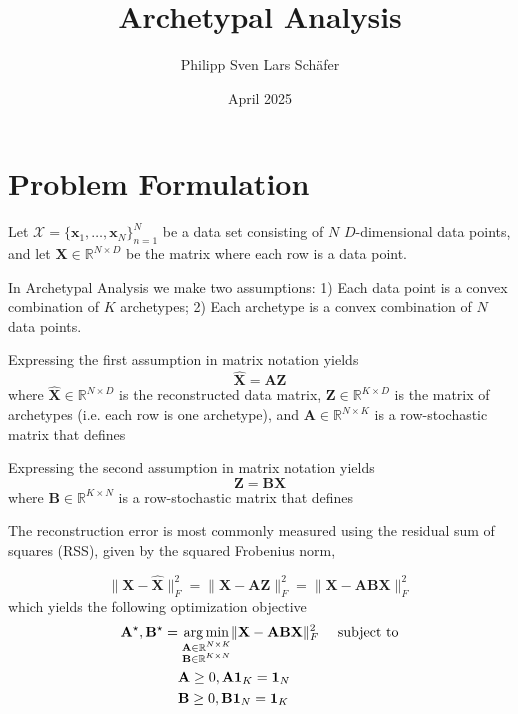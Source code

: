 \documentclass[oneside]{article}
\title{Archetypal Analysis}
\author{Philipp Sven Lars Schäfer}
\date{April 2025}
\begin{document}
\maketitle

\section{Problem Formulation}

Let $\mathcal{X}=\{\mathbf{x}_1, \ldots, \mathbf{x}_N\}_{n=1}^N$ be a data set consisting of $N$ $D$-dimensional data points, and let $\mathbf{X} \in \mathbb{R}^{N \times D}$ be the matrix where each row is a data point.

In Archetypal Analysis we make two assumptions: 1) Each data point is a convex combination of $K$ archetypes; 2) Each archetype is a convex combination of $N$ data points.

Expressing the first assumption in matrix notation yields
\begin{equation}
\label{eq:first-assumption}
\hat{\mathbf{X}} = \mathbf{A} \mathbf{Z}
\end{equation}
where $\hat{\mathbf{X}} \in \mathbb{R}^{N \times D}$ is the reconstructed data matrix, $\mathbf{Z} \in \mathbb{R}^{K \times D}$ is the matrix of archetypes (i.e. each row is one archetype), and $\mathbf{A} \in \mathbb{R}^{N \times K}$ is a row-stochastic matrix that defines 

Expressing the second assumption in matrix notation yields
\begin{equation}
\label{eq:second-assumption}
\mathbf{Z} = \mathbf{B} \mathbf{X}
\end{equation}
where $\mathbf{B} \in \mathbb{R}^{K \times N}$ is a row-stochastic matrix that defines 

The reconstruction error is most commonly measured using the residual sum of squares (RSS), given by the squared Frobenius norm,

\begin{equation}
\label{eq:rss}
\| \mathbf{X} - \hat{\mathbf{X}} \|_F^2 = \| \mathbf{X} - \mathbf{A} \mathbf{Z} \|_F^2 =  \| \mathbf{X} -  \mathbf{A} \mathbf{B} \mathbf{X} \|_F^2
\end{equation}
which yields the following optimization objective
\begin{equation}
\label{eq:objective}
\begin{aligned}
\mathbf{A}^\star, \mathbf{B}^\star =& \; \underset{\begin{subarray}{c} \mathbf{A} \in \mathbb{R}^{N \times K} \\ 
    \mathbf{B} \in \mathbb{R}^{K \times N} \end{subarray}}{\arg \min} \| \mathbf{X} - \mathbf{A} \mathbf{B} \mathbf{X}\|_F^2 \quad \text{ subject to} \\
& \mathbf{A} \geq 0, \mathbf{A} \mathbf{1}_K = \mathbf{1}_N \\
& \mathbf{B} \geq 0, \mathbf{B} \mathbf{1}_N = \mathbf{1}_K
\end{aligned}
\end{equation}
\end{document}
